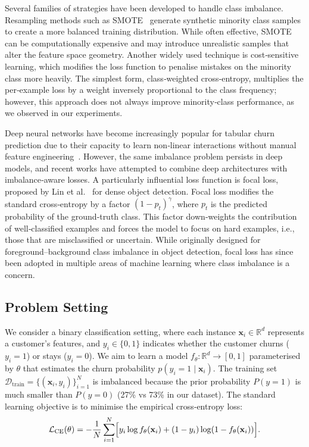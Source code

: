 \documentclass[11pt,a4paper]{article}
\begin{document}
Several families of strategies have been developed to handle class imbalance. Resampling methods such as SMOTE~\cite{chawla2002smote} generate synthetic minority class samples to create a more balanced training distribution. While often effective, SMOTE can be computationally expensive and may introduce unrealistic samples that alter the feature space geometry. Another widely used technique is cost‑sensitive learning, which modifies the loss function to penalise mistakes on the minority class more heavily. The simplest form, class‑weighted cross‑entropy, multiplies the per‑example loss by a weight inversely proportional to the class frequency; however, this approach does not always improve minority‑class performance, as we observed in our experiments.

Deep neural networks have become increasingly popular for tabular churn prediction due to their capacity to learn non‑linear interactions without manual feature engineering~\cite{fatima2024churn}. However, the same imbalance problem persists in deep models, and recent works have attempted to combine deep architectures with imbalance‑aware losses. A particularly influential loss function is focal loss, proposed by Lin et al.~\cite{lin2017focal} for dense object detection. Focal loss modifies the standard cross‑entropy by a factor $(1-p_t)^\gamma$, where $p_t$ is the predicted probability of the ground‑truth class. This factor down‑weights the contribution of well‑classified examples and forces the model to focus on hard examples, i.e., those that are misclassified or uncertain. While originally designed for foreground–background class imbalance in object detection, focal loss has since been adopted in multiple areas of machine learning where class imbalance is a concern.

\subsection{Problem Setting}
We consider a binary classification setting, where each instance $\mathbf{x}_i \in \mathbb{R}^d$ represents a customer's features, and $y_i \in \{0,1\}$ indicates whether the customer churns ($y_i = 1$) or stays ($y_i = 0$). We aim to learn a model $f_\theta : \mathbb{R}^d \to [0,1]$ parameterised by $\theta$ that estimates the churn probability $p(y_i = 1 \mid \mathbf{x}_i)$. The training set $\mathcal{D}_{\mathrm{train}} = \{(\mathbf{x}_i, y_i)\}_{i=1}^N$ is imbalanced because the prior probability $P(y=1)$ is much smaller than $P(y=0)$ (27\% vs 73\% in our dataset). The standard learning objective is to minimise the empirical cross‑entropy loss:
\begin{equation}
\mathcal{L}_{\mathrm{CE}}(\theta) = -\frac{1}{N}\sum_{i=1}^N\Bigl[y_i \log f_\theta(\mathbf{x}_i) + (1-y_i)\log(1-f_\theta(\mathbf{x}_i))\Bigr].
\label{eq:ce}
\end{equation}
\end{document}
